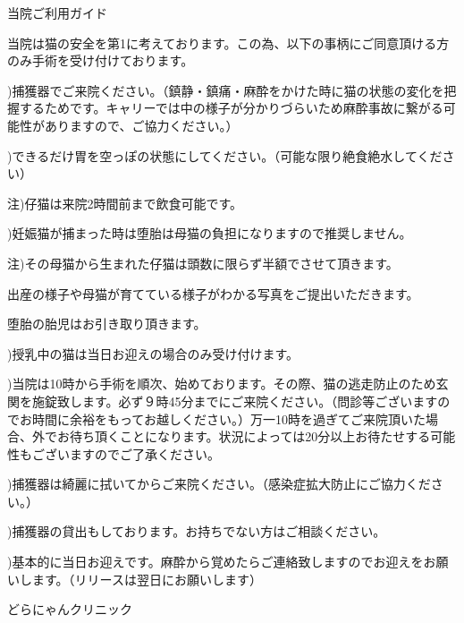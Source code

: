 \documentclass[b5paper]{jsarticle}
\begin{document}
\huge

当院ご利用ガイド\vspace{10pt}

\large

当院は猫の安全を第1に考えております。この為、以下の事柄にご同意頂ける方のみ手術を受け付けております。\vspace{20pt}


)捕獲器でご来院ください。（鎮静・鎮痛・麻酔をかけた時に猫の状態の変化を把握するためです。キャリーでは中の様子が分かりづらいため麻酔事故に繋がる可能性がありますので、ご協力ください。）\vspace{5pt}


)できるだけ胃を空っぽの状態にしてください。（可能な限り絶食絶水してください）\vspace{-2pt}

\begin{normalsize}注)仔猫は来院2時間前まで飲食可能です。\end{normalsize}\vspace{5pt}


)妊娠猫が捕まった時は堕胎は母猫の負担になりますので推奨しません。\vspace{-2pt}

\begin{normalsize}注)その母猫から生まれた仔猫は頭数に限らず半額でさせて頂きます。

\hspace{15pt}出産の様子や母猫が育てている様子がわかる写真をご提出いただきます。

\hspace{15pt}堕胎の胎児はお引き取り頂きます。\end{normalsize}\vspace{5pt}


)授乳中の猫は当日お迎えの場合のみ受け付けます。


)当院は10時から手術を順次、始めております。その際、猫の逃走防止のため玄関を施錠致します。必ず９時45分までにご来院ください。（問診等ございますのでお時間に余裕をもってお越しください。）万一10時を過ぎてご来院頂いた場合、外でお待ち頂くことになります。状況によっては20分以上お待たせする可能性もございますのでご了承ください。\vspace{5pt}


)捕獲器は綺麗に拭いてからご来院ください。（感染症拡大防止にご協力ください。）\vspace{5pt}


)捕獲器の貸出もしております。お持ちでない方はご相談ください。\vspace{5pt}


)基本的に当日お迎えです。麻酔から覚めたらご連絡致しますのでお迎えをお願いします。（リリースは翌日にお願いします）


\vspace{25pt}
\flushright どらにゃんクリニック
\end{document}
